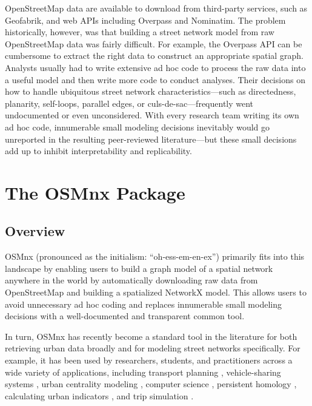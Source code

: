 \documentclass[12pt,letterpaper]{article} %
\begin{document}
OpenStreetMap data are available to download from third-party services, such as Geofabrik, and web APIs including Overpass and Nominatim. The problem historically, however, was that building a street network model from raw OpenStreetMap data was fairly difficult. For example, the Overpass API can be cumbersome to extract the right data to construct an appropriate spatial graph. Analysts usually had to write extensive ad hoc code to process the raw data into a useful model and then write more code to conduct analyses. Their decisions on how to handle ubiquitous street network characteristics---such as directedness, planarity, self-loops, parallel edges, or culs-de-sac---frequently went undocumented or even unconsidered. With every research team writing its own ad hoc code, innumerable small modeling decisions inevitably would go unreported in the resulting peer-reviewed literature---but these small decisions add up to inhibit interpretability and replicability.

\section{The OSMnx Package}

\subsection{Overview}

OSMnx (pronounced as the initialism: \enquote{oh-ess-em-en-ex}) primarily fits into this landscape by enabling users to build a graph model of a spatial network anywhere in the world by automatically downloading raw data from OpenStreetMap and building a spatialized NetworkX model. This allows users to avoid unnecessary ad hoc coding and replaces innumerable small modeling decisions with a well-documented and transparent common tool.

In turn, OSMnx has recently become a standard tool in the literature for both retrieving urban data broadly and for modeling street networks specifically. For example, it has been used by researchers, students, and practitioners across a wide variety of applications, including transport planning \citep[e.g.,][]{natera_orozco_data-driven_2020,dumedah_case_2020}, vehicle-sharing systems \citep[e.g.,][]{luo_d3p_2020,zhang_electric_2019}, urban centrality modeling \citep[e.g.,][]{wang_road_2020,torres_alisis_2019}, computer science \citep[e.g.,][]{yin_multi-task_2020,young_automatic_2020}, persistent homology \citep[e.g.,][]{feng_spatial_2020,abdelkader_topological_2018}, calculating urban indicators \citep[e.g.,][]{quistberg_building_2019,wang_impacts_2020}, and trip simulation \citep[e.g.,][]{hernandez-hernandez_anger_2019,merchan_quantifying_2020}.
\end{document}
